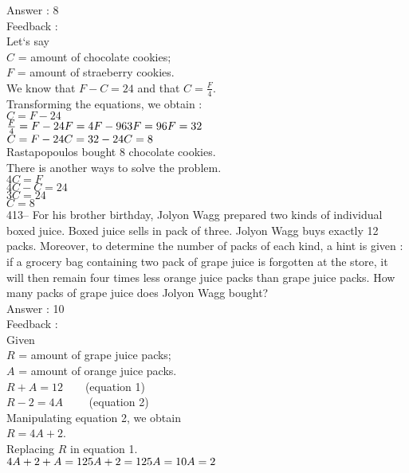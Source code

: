 ﻿\documentclass[letterpaper, 12pt]{article}
\begin{document}
Answer : 8\\

Feedback : \\
Let`s say\\
$C$ = amount of chocolate cookies;\\
$F$ = amount of straeberry cookies.\\
We know that $F-C=24$ and that $C=\frac{F}{4}$.\\
Transforming the equations, we obtain :\\
$C=F-24$\\
$\frac{F}{4}=F-24\\
F=4F-96\\
3F=96\\
F=32$\\

$C=F-24\\
C=32-24\\
C=8$\\
Rastapopoulos bought 8 chocolate cookies.\\

There is another ways to solve the problem.\\
$4C=F$\\
$4C-C=24$\\
$3C=24$\\
$C=8$\\


413-- For his brother birthday, Jolyon Wagg prepared two kinds of individual boxed juice. Boxed juice sells in pack of three.  Jolyon Wagg buys exactly 12 packs. Moreover, to determine the number of packs of each kind, a hint is given : if a grocery bag containing two pack of grape juice is forgotten at the store, it will then remain four times less orange juice packs than grape juice packs. How many packs of grape juice does Jolyon Wagg bought?\\

Answer : 10\\

Feedback : \\
Given\\
$R$ = amount of grape juice packs;\\
$A$ = amount of orange juice packs.\\
$R+A=12  \qquad$(equation 1)\\
$R-2=4A \qquad$ (equation 2)\\
Manipulating equation 2, we obtain\\
$R=4A+2$.\\
Replacing $R$ in equation 1.\\
$4A+2+A=12\\
5A+2=12\\
5A=10\\
A=2$\\
\end{document}
